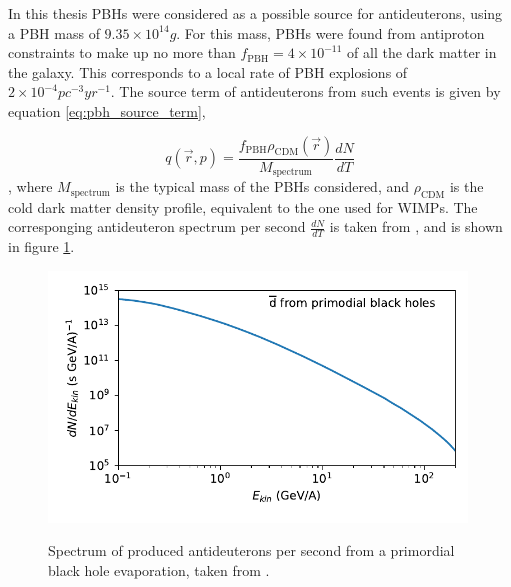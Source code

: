 In this thesis PBHs were considered as a possible source for antideuterons, using a PBH mass of $9.35\times 10^{14}g$. For this mass, PBHs were found from antiproton constraints to make up no more than $f_\mathrm{PBH} = 4\times 10^{-11}$ of all the dark matter in the galaxy. This corresponds to a local rate of PBH explosions of $2\times 10^{-4} pc^{-3}yr^{-1}$. The source term of antideuterons from such events is given by equation \ref{eq:pbh_source_term},

\begin{equation}\label{eq:pbh_source_term}
	q(\vec{r}, p) = \frac{f_\mathrm{PBH} \rho_{\mathrm{CDM}} (\vec{r})}{M_\mathrm{spectrum}}\frac{dN}{dT}
\end{equation}
, where $M_\mathrm{spectrum}$ is the typical mass of the PBHs considered, and $\rho_\mathrm{CDM}$ is the cold dark matter density profile, equivalent to the one used for WIMPs. The corresponging antideuteron spectrum per second $\frac{dN}{dT}$ is taken from \cite{}, and is shown in figure \ref{fig:pbh_source_spectrum}.

\begin{figure}[hbtp]
		\centering
		\includegraphics[width=0.99\textwidth]{figures/pbh_source_spectrum_dbar.pdf}
		\label{fig:pbh_source_spectrum}
		\caption{Spectrum of produced antideuterons per second from a primordial black hole evaporation, taken from \cite{}.}
\end{figure}



